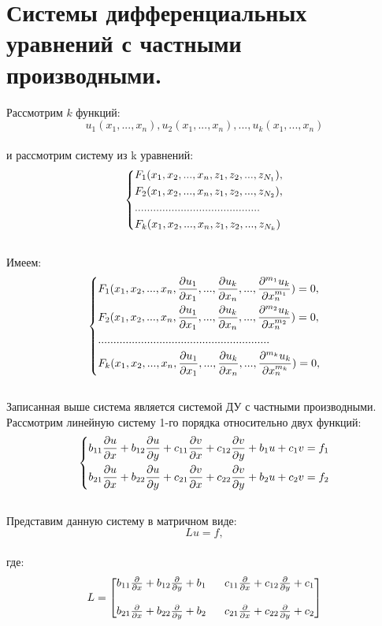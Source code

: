 \documentclass[../main.tex]{subfiles}
\begin{document}
\section{Системы дифференциальных уравнений с частными производными.}
Рассмотрим $k$ функций:
$$u_1(x_1,...,x_n),u_2(x_1,...,x_n),...,u_k(x_1,...,x_n)$$ \\
и рассмотрим систему из k уравнений:
$$\begin{dcases}
		F_1(x_1, x_2,..., x_n, z_1, z_2,..., z_{N_1}), \\
		F_2(x_1, x_2,..., x_n, z_1, z_2,..., z_{N_2}), \\
		.........................................      \\
		F_k(x_1, x_2,..., x_n, z_1, z_2,..., z_{N_k})
	\end{dcases} $$ \\
Имеем:
$$\begin{dcases}
		F_1(x_1, x_2,..., x_n, \frac{\partial u_1}{\partial x_1},...,\frac{\partial u_k}{\partial x_n},..., \frac{\partial ^{m_1} u_k}{\partial x^{m_1}_n}) = 0, \\
		F_2(x_1, x_2,..., x_n, \frac{\partial u_1}{\partial x_1},...,\frac{\partial u_k}{\partial x_n},..., \frac{\partial ^{m_2} u_k}{\partial x^{m_2}_n}) = 0, \\
		........................................................                                                                 \\
		F_k(x_1, x_2,..., x_n, \frac{\partial u_1}{\partial x_1},...,\frac{\partial u_k}{\partial x_n},..., \frac{\partial ^{m_k} u_k}{\partial x^{m_k}_n}) = 0, \\
	\end{dcases} $$ \\
Записанная выше система является системой ДУ с частными производными.\\
Рассмотрим линейную систему 1-го порядка относительно двух функций:\\
$$
	\begin{dcases}
		b_{11}\frac{\partial u}{\partial x} + b_{12}\frac{\partial u}{\partial y} + c_{11}\frac{\partial v}{\partial x} + c_{12}\frac{\partial v}{\partial y}+b_1u + c_1v = f_1 \\
		b_{21}\frac{\partial u}{\partial x} + b_{22}\frac{\partial u}{\partial y} + c_{21}\frac{\partial v}{\partial x} + c_{22}\frac{\partial v}{\partial y}+b_2u + c_2v = f_2
	\end{dcases}$$\\
Представим данную систему в матричном виде:\\
$$Lu = f,$$ \\
где:
$$
	L = \begin{bmatrix}
		b_{11}\pderiv{}{x} + b_{12}\pderiv{}{y} + b_1 \  & \ c_{11}\pderiv{}{x} + c_{12}\pderiv{}{y} + c_1 \\ \\
		b_{21}\pderiv{}{x} + b_{22}\pderiv{}{y} + b_2 \  & \ c_{21}\pderiv{}{x} + c_{22}\pderiv{}{y} + c_2
	\end{bmatrix}
$$ \\
\end{document}

